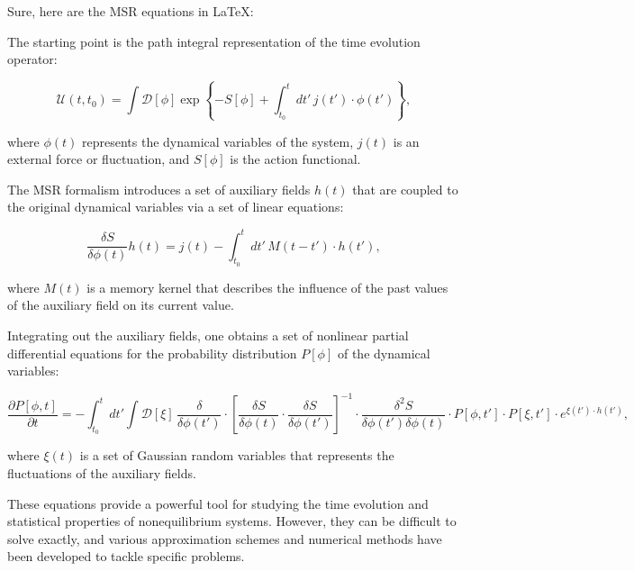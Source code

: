 \documentclass[12pt]{article}
\title{\vspace{-3em}}
\date{\today}
\begin{document}
\maketitle
Sure, here are the MSR equations in \LaTeX:

The starting point is the path integral representation of the time evolution operator:

\begin{equation}
    \mathcal{U}(t,t_0) = \int \mathcal{D}[\phi] \exp \left\{ -S[\phi] + \int_{t_0}^t dt' \, j(t') \cdot \phi(t') \right\},
\end{equation}

where $\phi(t)$ represents the dynamical variables of the system, $j(t)$ is an external force or fluctuation, and $S[\phi]$ is the action functional.

The MSR formalism introduces a set of auxiliary fields $h(t)$ that are coupled to the original dynamical variables via a set of linear equations:

\begin{equation}
    \frac{\delta S}{\delta \phi(t)} h(t) = j(t) - \int_{t_0}^t dt' \, M(t-t') \cdot h(t'),
\end{equation}

where $M(t)$ is a memory kernel that describes the influence of the past values of the auxiliary field on its current value.

Integrating out the auxiliary fields, one obtains a set of nonlinear partial differential equations for the probability distribution $P[\phi]$ of the dynamical variables:

\begin{equation}
    \frac{\partial P[\phi,t]}{\partial t} = -\int_{t_0}^t dt' \int \mathcal{D}[\xi] \, \frac{\delta}{\delta \phi(t')} \cdot \left[ \frac{\delta S}{\delta \phi(t)} \cdot \frac{\delta S}{\delta \phi(t')} \right]^{-1} \cdot \frac{\delta^2 S}{\delta \phi(t') \delta \phi(t)} \cdot P[\phi,t'] \cdot P[\xi,t'] \cdot e^{\xi(t') \cdot h(t')},
\end{equation}

where $\xi(t)$ is a set of Gaussian random variables that represents the fluctuations of the auxiliary fields.

These equations provide a powerful tool for studying the time evolution and statistical properties of nonequilibrium systems. However, they can be difficult to solve exactly, and various approximation schemes and numerical methods have been developed to tackle specific problems.
\end{document}

